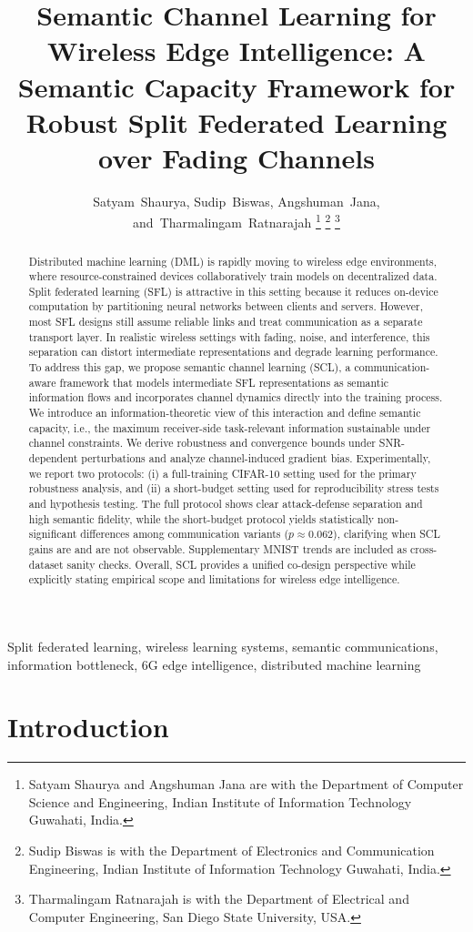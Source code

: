 \documentclass[10pt,journal]{IEEEtran}
\title{Semantic Channel Learning for Wireless Edge Intelligence: A Semantic Capacity Framework for Robust Split Federated Learning over Fading Channels
\vspace{-0.3em}
}
\author{

Satyam~Shaurya,
Sudip~Biswas,
Angshuman~Jana,
and~Tharmalingam~Ratnarajah
%
\thanks{Satyam Shaurya and Angshuman Jana are with the Department of Computer Science and Engineering, Indian Institute of Information Technology Guwahati, India.}
%
\thanks{Sudip Biswas is with the Department of Electronics and Communication Engineering, Indian Institute of Information Technology Guwahati, India.}
%
\thanks{Tharmalingam Ratnarajah is with the Department of Electrical and Computer Engineering, San Diego State University, USA.}\vspace{-2.5em}
}
\begin{document}
\maketitle
\begin{abstract}
Distributed machine learning (DML) is rapidly moving to wireless edge environments, where resource-constrained devices collaboratively train models on decentralized data. Split federated learning (SFL) is attractive in this setting because it reduces on-device computation by partitioning neural networks between clients and servers. However, most SFL designs still assume reliable links and treat communication as a separate transport layer. In realistic wireless settings with fading, noise, and interference, this separation can distort intermediate representations and degrade learning performance. To address this gap, we propose semantic channel learning (SCL), a communication-aware framework that models intermediate SFL representations as semantic information flows and incorporates channel dynamics directly into the training process. We introduce an information-theoretic view of this interaction and define semantic capacity, i.e., the maximum receiver-side task-relevant information sustainable under channel constraints. We derive robustness and convergence bounds under SNR-dependent perturbations and analyze channel-induced gradient bias. Experimentally, we report two protocols: (i) a full-training CIFAR-10 setting used for the primary robustness analysis, and (ii) a short-budget setting used for reproducibility stress tests and hypothesis testing. The full protocol shows clear attack-defense separation and high semantic fidelity, while the short-budget protocol yields statistically non-significant differences among communication variants ($p\approx0.062$), clarifying when SCL gains are and are not observable. Supplementary MNIST trends are included as cross-dataset sanity checks. Overall, SCL provides a unified co-design perspective while explicitly stating empirical scope and limitations for wireless edge intelligence.
\end{abstract}
\begin{IEEEkeywords}
Split federated learning, wireless learning systems,
semantic communications, information bottleneck,
6G edge intelligence, distributed machine learning
\end{IEEEkeywords}
\section{Introduction}
\end{document}
